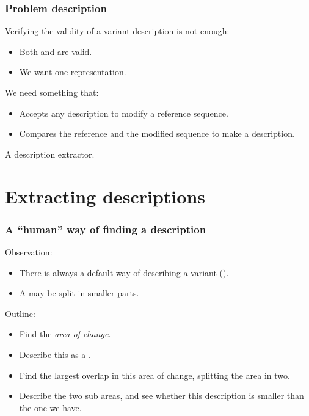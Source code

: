 \documentclass[slidestop]{beamer}
\begin{document}
\begin{frame}
  \frametitle{Problem description}

  Verifying the validity of a variant description is not enough:
  \begin{itemize}
    \item Both  and \bt{[6G>A;7C>A]} are valid.
    \item We want one representation.
  \end{itemize}
  \bigskip
  \pause

  We need something that:
  \begin{itemize}
    \item Accepts any description to modify a reference sequence.
    \item Compares the reference and the modified sequence to make a
      description.
  \end{itemize}
  \bigskip
  \pause

  A description extractor.
\end{frame}

\section{Extracting descriptions}
\begin{frame}
  \frametitle{A ``human'' way of finding a description}

  Observation:
  \begin{itemize}
    \item There is always a default way of describing a variant ().
    \item A  may be split in smaller parts.
  \end{itemize}
  \bigskip
  \pause

  Outline:
  \begin{itemize}
    \item Find the \emph{area of change}.
    \item Describe this as a .
    \item Find the largest overlap in this area of change, splitting the area
      in two.
    \item Describe the two sub areas, and see whether this description is
      smaller than the one we have.
  \end{itemize}
\end{frame}
\end{document}
